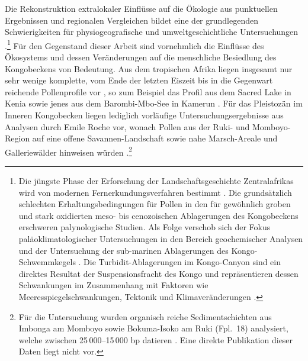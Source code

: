 \begin{multicols}{2}
Die Rekonstruktion extralokaler Einflüsse auf die Ökologie aus punktuellen Ergebnissen und regionalen Vergleichen bildet eine der grundlegenden Schwierigkeiten für physiogeografische und umweltgeschichtliche Untersuchungen \parencite[42]{Sangen.2009}.\footnote{Die jüngste Phase der Erforschung der Landschaftsgeschichte Zentralafrikas wird von modernen Fernerkundungsverfahren bestimmt \parencite[6]{Runge.2001}. Die grundsätzlich schlechten Erhaltungsbedingungen für Pollen in den für gewöhnlich groben und stark oxidierten meso- bis cenozoischen Ablagerungen des Kongobeckens erschweren palynologische Studien. Als Folge verschob sich der Fokus paläoklimatologischer Untersuchungen in den Bereich geochemischer Analysen und der Untersuchung der sub-marinen Ablagerungen des Kongo-Schwemmkegels \parencite[312]{Giresse.2005b}. Die Turbidit-Ablagerungen im Kongo-Canyon sind ein direktes Resultat der Suspensionsfracht des Kongo und repräsentieren dessen Schwankungen im Zusammenhang mit Faktoren wie Meeresspiegelschwankungen, Tektonik und Klimaveränderungen \parencite[2176]{Savoye.2009}.} Für den Gegenstand dieser Arbeit sind vornehmlich die Einflüsse des Ökosystems und dessen Veränderungen auf die menschliche Besiedlung des Kongobeckens von Bedeutung. Aus dem tropischen Afrika liegen insgesamt nur sehr wenige komplette, vom Ende der letzten Eiszeit bis in die Gegenwart reichende Pollenprofile vor \parencite[2682]{Lezine.2013}, so zum Beispiel das Profil aus dem Sacred Lake in Kenia \parencite[65--73; Beilage Fig.~15]{Coetzee.1967} sowie jenes aus dem Barombi-Mbo-See in Kamerun \parencite{Maley.1991}. Für das Pleistozän im Inneren Kongobecken liegen lediglich vorläufige Untersuchungsergebnisse aus Analysen durch Emile Roche vor, wonach Pollen aus der Ruki- und Momboyo-Region auf eine offene Savannen-Landschaft sowie nahe Marsch-Areale und Galleriewälder hinweisen würden \parencite[181]{Fiedler.1985}.\footnote{Für die Untersuchung wurden organisch reiche Sedimentschichten aus Imbonga am Momboyo \parencite[siehe][542\,f. Karte~1 Fpl.~43]{Wotzka.1995} sowie Bokuma-Isoko am Ruki (Fpl.~18) analysiert, welche zwischen 25\,000--15\,000 bp datieren \parencite[182]{Fiedler.1985}. Eine direkte Publikation dieser Daten liegt nicht vor.}


\end{multicols}
